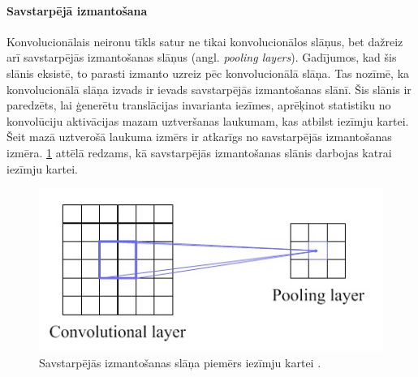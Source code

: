\documentclass[12pt,paper=a4]{report}
\begin{document}
\paragraph{Savstarpējā izmantošana} Konvolucionālais neironu tīkls satur ne tikai konvolucionālos slāņus, bet dažreiz arī savstarpējās izmantošanas slāņus (angl. \textit{pooling layers}). Gadījumos, kad šis slānis eksistē, to parasti izmanto uzreiz pēc konvolucionālā slāņa. Tas nozīmē, ka konvolucionālā slāņa izvads ir ievads savstarpējās izmantošanas slānī. Šis slānis ir paredzēts, lai ģenerētu translācijas invarianta iezīmes, aprēķinot statistiku no konvolūciju aktivācijas mazam uztveršanas laukumam, kas atbilst iezīmju kartei. Šeit mazā uztverošā laukuma izmērs ir atkarīgs no savstarpējās izmantošanas izmēra. \ref{fig:pooling3} attēlā redzams, kā savstarpējās izmantošanas slānis darbojas katrai iezīmju kartei.\cite{convolutionalNN}
\begin{figure}[h!]
\centering
\includegraphics[width=.6\linewidth]{pooling}
\caption{Savstarpējās izmantošanas slāņa piemērs iezīmju kartei \cite{convolutionalNN}.}
\label{fig:pooling3}
\end{figure}
\end{document}
